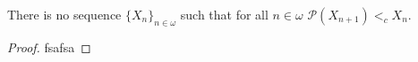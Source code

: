 \documentclass{article}
\begin{document}
\begin{theorem}[ZF]
	There is no sequence $\{X_n\}_{n\in\omega}$ such that for all $n\in\omega$ $\mathcal{P}(X_{n+1}) <_c X_n$.
\end{theorem}
\begin{proof}
	fsafsa
\end{proof}




\printindex
\end{document}
